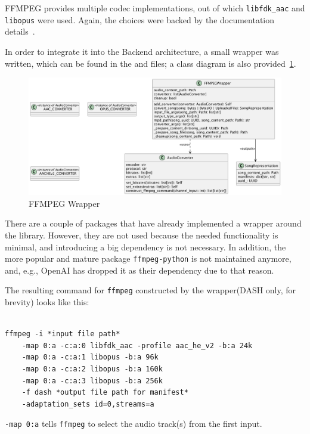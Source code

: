 FFMPEG provides multiple codec implementations, out of which \texttt{libfdk\_aac} and \texttt{libopus} were used.
Again, the choices were backed by the documentation details~\cite{libfdkaac,libopus}.

In order to integrate it into the Backend architecture, a small wrapper was written, which can be found in the
 and  files; a class diagram is also
provided~\ref{fig:ffmpeg}.

\begin{figure}[htbp]
    \centering
    \includegraphics[width=1\textwidth, keepaspectratio]{diagrams/ffmpeg.png}
    \caption{FFMPEG Wrapper}
    \label{fig:ffmpeg}
\end{figure}

There are a couple of packages that have already implemented a wrapper around the library. However,
they are not used because the needed functionality is minimal, and introducing a big
dependency is not necessary. In addition, the more popular and mature package \texttt{ffmpeg-python}\cite{ffmpegpython}
is not maintained anymore, and, e.g., OpenAI has dropped it as their dependency due to that reason\cite{ffmpegopenai}.

The resulting command for \texttt{ffmpeg} constructed by the wrapper(DASH only, for brevity) looks like this:

\begin{verbatim}

ffmpeg -i *input file path*
    -map 0:a -c:a:0 libfdk_aac -profile aac_he_v2 -b:a 24k
    -map 0:a -c:a:1 libopus -b:a 96k
    -map 0:a -c:a:2 libopus -b:a 160k
    -map 0:a -c:a:3 libopus -b:a 256k
    -f dash *output file path for manifest*
    -adaptation_sets id=0,streams=a
\end{verbatim}

\texttt{-map 0:a} tells \texttt{ffmpeg} to select the audio track(s) from the first input.

